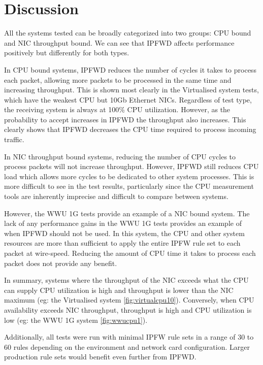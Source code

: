 \documentclass[journal]{IEEEtran}
\begin{document}
  \section{Discussion} \label{discussion}

    All the systems tested can be broadly categorized into two groups: CPU
    bound and NIC throughput bound. We can see that IPFWD affects performance
    positively but differently for both types. 

    In CPU bound systems, IPFWD reduces the number of cycles it takes to
    process each packet, allowing more packets to be processed in the same time
    and increasing throughput. This is shown most clearly in the Virtualised
    system tests, which have the weakest CPU but 10Gb Ethernet NICs. Regardless
    of test type, the receiving system is always at 100\% CPU utilization.
    However, as the probability to accept increases in IPFWD the throughput
    also increases.  This clearly shows that IPFWD decreases the CPU time
    required to process incoming traffic.

    In NIC throughput bound systems, reducing the number of CPU cycles to
    process packets will not increase throughput. However, IPFWD still reduces
    CPU load which allows more cycles to be dedicated to other system
    processes. This is more difficult to see in the test results, particularly
    since the CPU measurement tools are inherently imprecise and difficult to
    compare between systems. 
    
    However, the WWU 1G tests provide an example of a NIC bound system. The
    lack of any performance gains in the WWU 1G tests provides an example of
    when IPFWD should not be used. In this system, the CPU and other system
    resources are more than sufficient to apply the entire IPFW rule set to
    each packet at wire-speed. Reducing the amount of CPU time it takes to
    process each packet does not provide any benefit.

    In summary, systems where the throughput of the NIC exceeds what the CPU
    can supply CPU utilization is high and throughput is lower than the NIC
    maximum (eg: the Virtualised system \ref{fig:virtualcpu10}). Conversely,
    when CPU availability exceeds NIC throughput, throughput is high and CPU
    utilization is low (eg: the WWU 1G system \ref{fig:wwucpu1}).

    Additionally, all tests were run with minimal IPFW rule sets in a range of
    30 to 60 rules depending on the environment and network card configuration.
    Larger production rule sets would benefit even further from IPFWD.
\end{document}
